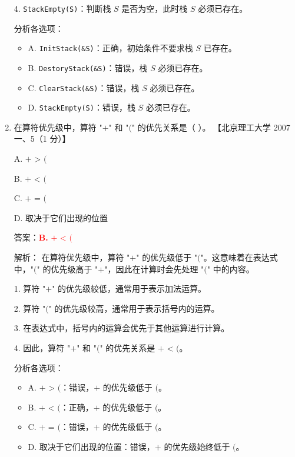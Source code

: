 \documentclass[lang=cn,newtx,10pt,scheme=chinese]{../../../elegantbook}
\begin{document}
\begin{enumerate}
    4. \texttt{StackEmpty(S)}：判断栈 $S$ 是否为空，此时栈 $S$ 必须已存在。

    分析各选项：
    \begin{itemize}
        \item A. \texttt{InitStack(\&S)}：正确，初始条件不要求栈 $S$ 已存在。
        
        \item B. \texttt{DestoryStack(\&S)}：错误，栈 $S$ 必须已存在。
        
        \item C. \texttt{ClearStack(\&S)}：错误，栈 $S$ 必须已存在。
        
        \item D. \texttt{StackEmpty(S)}：错误，栈 $S$ 必须已存在。
    \end{itemize}

    \item 在算符优先级中，算符 "$+$" 和 "$($" 的优先关系是（ ）。  
    【北京理工大学 2007 一、5（1 分）】  

    A. $+$ > $($  

    B. $+$ < $($  

    C. $+$ = $($  

    D. 取决于它们出现的位置  

    答案：\textcolor{red}{\textbf{B.} $+$ < $($}

    解析：
    在算符优先级中，算符 "$+$" 的优先级低于 "$($"。这意味着在表达式中，"$($" 的优先级高于 "$+$"，因此在计算时会先处理 "$($" 中的内容。

    1. 算符 "$+$" 的优先级较低，通常用于表示加法运算。

    2. 算符 "$($" 的优先级较高，通常用于表示括号内的运算。

    3. 在表达式中，括号内的运算会优先于其他运算进行计算。

    4. 因此，算符 "$+$" 和 "$($" 的优先关系是 $+$ < $($。

    分析各选项：
    \begin{itemize}
        \item A. $+$ > $($：错误，$+$ 的优先级低于 $($。
        
        \item B. $+$ < $($：正确，$+$ 的优先级低于 $($。
        
        \item C. $+$ = $($：错误，$+$ 的优先级低于 $($。
        
        \item D. 取决于它们出现的位置：错误，$+$ 的优先级始终低于 $($。
        \end{itemize}


\end{enumerate}
\end{document}
